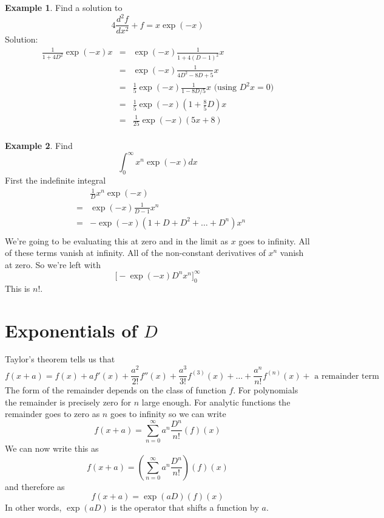 \documentclass[a4paper]{article}
\theoremstyle{definition}
\newtheorem{example}{Example}[section]
\begin{document}
\begin{example}
Find a solution to
\[
4\frac{d^2f}{dx^2}+f = x\exp(-x)
\]
Solution:
\begin{eqnarray*}
\frac{1}{1+4D^2}\exp(-x)x & = & \exp(-x)\frac{1}{1+4(D-1)^2}x \\
& = & \exp(-x)\frac{1}{4D^2-8D+5}x \\
& = & \frac{1}{5}\exp(-x)\frac{1}{1-8D/5}x \mbox{ (using $D^2x=0$)}\\
& = & \frac{1}{5}\exp(-x)(1+\frac{8}{5}D)x \\
& = & \frac{1}{25}\exp(-x)(5x+8) \\
\end{eqnarray*}

\end{example}

\begin{example}
Find
\[
\int_0^\infty x^n\exp(-x)dx
\]
First the indefinite integral
\begin{eqnarray*}
&   & \frac{1}{D}x^n\exp(-x) \\
& = & \exp(-x)\frac{1}{D-1}x^n \\
& = & -\exp(-x)(1+D+D^2+\ldots+D^n)x^n \\
\end{eqnarray*}
We're going to be evaluating this at zero and in the limit as $x$ goes to infinity.
All of these terms vanish at infinity.
All of the non-constant derivatives of $x^n$ vanish at zero.
So we're left with
\[
\Big[-\exp(-x)D^nx^n\Big]_0^\infty
\]
This is $n!$.
\end{example}

\section{Exponentials of $D$}
Taylor's theorem tells us that
\[
f(x+a) = f(x)+af'(x)+\frac{a^2}{2!}f''(x)+\frac{a^3}{3!}f^{(3)}(x)+\ldots+\frac{a^n}{n!}f^{(n)}(x)+\mbox{ a remainder term}
\]
The form of the remainder depends on the class of function $f$.
For polynomials the remainder is precisely zero for $n$ large enough.
For analytic functions the remainder goes to zero as $n$ goes to infinity so we can write
\[
f(x+a) = \sum_{n=0}^\infty a^n\frac{D^n}{n!}(f)(x)
\]
We can now write this as
\[
f(x+a) = (\sum_{n=0}^\infty a^n\frac{D^n}{n!})(f)(x)
\]
and therefore as
\[
f(x+a) = \exp(aD)(f)(x)
\]
In other words, $\exp(aD)$ is the operator that shifts a function by $a$.
\end{document}

